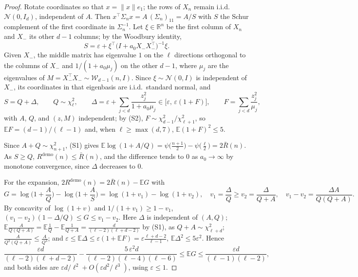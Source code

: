 \documentclass{article}
\newcommand{\E}{\mathbb{E}}
\newcommand{\R}{\mathbb{R}}
\begin{document}
\begin{proof}
Rotate coordinates so that $x = \|x\| e_1$; the rows of $X_n$ remain i.i.d.\ $\mathcal{N}(0, I_d)$, independent of $A$. Then $x^\top \Sigma_n x = A\,(\Sigma_n)_{11} = A/S$ with $S$ the Schur complement of the first coordinate in $\Sigma_n^{-1}$. Let $\xi \in \R^n$ be the first column of $X_n$ and $X_-$ its other $d-1$ columns; by the Woodbury identity,
\[
S = \varepsilon + \xi^\top \big(I + a_0 X_- X_-^\top\big)^{-1} \xi .
\]
Given $X_-$, the middle matrix has eigenvalue $1$ on the $\ell$ directions orthogonal to the columns of $X_-$ and $1/(1 + a_0 \mu_j)$ on the other $d - 1$, where $\mu_j$ are the eigenvalues of $M = X_-^\top X_- \sim \mathcal{W}_{d-1}(n, I)$. Since $\xi \sim \mathcal{N}(0, I)$ is independent of $X_-$, its coordinates in that eigenbasis are i.i.d.\ standard normal, and
\[
S = Q + \Delta, \qquad Q \sim \chi^2_\ell, \qquad
\Delta = \varepsilon + \sum_{j < d} \frac{z_j^2}{1 + a_0 \mu_j} \in \big[\varepsilon,\, \varepsilon(1 + F)\big], \qquad F = \sum_{j < d} \frac{z_j^2}{\mu_j},
\]
with $A$, $Q$, and $(z, M)$ independent; by (S2), $F \sim \chi^2_{d-1} / \chi^2_{\ell+1}$, so $\E F = (d-1)/(\ell-1)$ and, when $\ell \ge \max(d, 7)$, $\E (1+F)^2 \le 5$.

Since $A + Q \sim \chi^2_{n+1}$, (S1) gives $\E \log(1 + A/Q) = \psi\big(\tfrac{n+1}{2}\big) - \psi\big(\tfrac{\ell}{2}\big) = 2\bar R(n)$. As $S \ge Q$, $R^{\mathrm{demo}}(n) \le \bar R(n)$, and the difference tends to $0$ as $a_0 \to \infty$ by monotone convergence, since $\Delta$ decreases to $0$.

For the expansion, $2R^{\mathrm{demo}}(n) = 2\bar R(n) - \E G$ with
\[
G = \log\Big(1 + \frac{A}{Q}\Big) - \log\Big(1 + \frac{A}{S}\Big) = \log(1 + v_1) - \log(1 + v_2), \quad v_1 = \frac{\Delta}{Q} \ge v_2 = \frac{\Delta}{Q + A}, \quad v_1 - v_2 = \frac{\Delta A}{Q(Q+A)} .
\]
By concavity of $\log(1+v)$ and $1/(1+v_1) \ge 1 - v_1$, $(v_1 - v_2)(1 - \Delta/Q) \le G \le v_1 - v_2$. Here $\Delta$ is independent of $(A, Q)$; $\E \frac{A}{Q(Q+A)} = \E\frac1Q - \E\frac{1}{Q+A} = \frac{d}{(\ell-2)(\ell+d-2)}$ by (S1), as $Q + A \sim \chi^2_{\ell+d}$; $\frac{A}{Q^2(Q+A)} \le \frac{A}{Q^3}$; and $\varepsilon \le \E\Delta \le \varepsilon(1 + \E F) = \varepsilon\frac{\ell+d-2}{\ell-1}$, $\E \Delta^2 \le 5\varepsilon^2$. Hence
\[
\frac{\varepsilon d}{(\ell-2)(\ell+d-2)} - \frac{5\,\varepsilon^2 d}{(\ell-2)(\ell-4)(\ell-6)} \le \E G \le \frac{\varepsilon d}{(\ell-1)(\ell-2)} ,
\]
and both sides are $\varepsilon d / \ell^2 + O(\varepsilon d^2 / \ell^3)$, using $\varepsilon \le 1$.
\end{proof}
\end{document}
